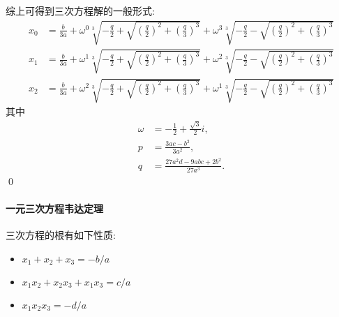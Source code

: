 \begin{solution}
综上可得到三次方程解的一般形式:
\[ \begin{aligned}
x_0 &= \frac{b}{3a}
    + \omega^{0}\sqrt[3]{-\frac{q}{2}+\sqrt{(\frac{q}{2})^2 + (\frac{q}{3})^3}}
    + \omega^{3}\sqrt[3]{-\frac{q}{2}-\sqrt{(\frac{q}{2})^2 + (\frac{q}{3})^3}} \\
x_1 &= \frac{b}{3a}
    + \omega^{1}\sqrt[3]{-\frac{q}{2}+\sqrt{(\frac{q}{2})^2 + (\frac{q}{3})^3}}
    + \omega^{2}\sqrt[3]{-\frac{q}{2}-\sqrt{(\frac{q}{2})^2 + (\frac{q}{3})^3}} \\
x_2 &= \frac{b}{3a}
    + \omega^{2}\sqrt[3]{-\frac{q}{2}+\sqrt{(\frac{q}{2})^2 + (\frac{q}{3})^3}}
    + \omega^{1}\sqrt[3]{-\frac{q}{2}-\sqrt{(\frac{q}{2})^2 + (\frac{q}{3})^3}}
\end{aligned} \]
其中
\[ \begin{aligned}
\omega &= -\frac{1}{2} + \frac{\sqrt{3}}{2} i, \\
p &= \frac{3ac-b^2}{3a^2}, \\
q &= \frac{27a^2d - 9abc + 2b^2}{27a^3}.
\end{aligned} \]
\qed
\end{solution}
\paragraph{一元三次方程韦达定理}
\begin{lemma}[韦达定理]
三次方程的根有如下性质:
\begin{itemize}
\item $x_1 + x_2 + x_3 = -b/a$
\item $x_1 x_2 + x_2 x_3 + x_1 x_3 = c/a$
\item $x_1 x_2 x_3 = -d/a$
\end{itemize}
\end{lemma}
\endinput
